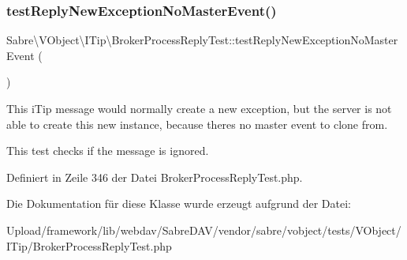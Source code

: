 \subsubsection{\texorpdfstring{test\+Reply\+New\+Exception\+No\+Master\+Event()}{testReplyNewExceptionNoMasterEvent()}}
{\footnotesize\ttfamily Sabre\textbackslash{}\+V\+Object\textbackslash{}\+I\+Tip\textbackslash{}\+Broker\+Process\+Reply\+Test\+::test\+Reply\+New\+Exception\+No\+Master\+Event (\begin{DoxyParamCaption}{ }\end{DoxyParamCaption})}

This i\+Tip message would normally create a new exception, but the server is not able to create this new instance, because there\textquotesingle{}s no master event to clone from.

This test checks if the message is ignored.

Definiert in Zeile 346 der Datei Broker\+Process\+Reply\+Test.\+php.



Die Dokumentation für diese Klasse wurde erzeugt aufgrund der Datei\+:\begin{DoxyCompactItemize}
\item 
Upload/framework/lib/webdav/\+Sabre\+D\+A\+V/vendor/sabre/vobject/tests/\+V\+Object/\+I\+Tip/Broker\+Process\+Reply\+Test.\+php\end{DoxyCompactItemize}
